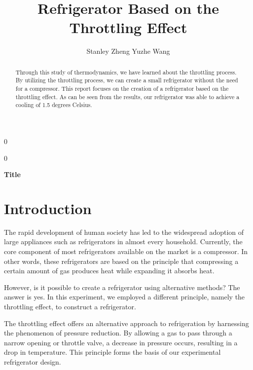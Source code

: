 \documentclass[12pt]{article}
\newcommand{\blind}{0}
\begin{document}

%

\def\spacingset#1{\renewcommand{\baselinestretch}%
{#1}\small\normalsize} \spacingset{1}



\blind
{
  \title{\bf Refrigerator Based on the Throttling Effect }
  \author{Stanley Zheng \quad Yuzhe Wang}
  \maketitle
} \fi

\blind
{
  \bigskip
  \bigskip
  \bigskip
  \begin{center}
    {\LARGE\bf Title}
\end{center}
  \medskip
} \fi

\bigskip
\begin{abstract}
Through this study of thermodynamics, we have learned about the throttling process. By utilizing the throttling process, we can create a small refrigerator without the need for a compressor. This report focuses on the creation of a refrigerator based on the throttling effect. As can be seen from the results, our refrigerator was able to achieve a cooling of 1.5 degrees Celsius.
\end{abstract}


\spacingset{1.45}
\section{Introduction}
\label{sec:intro}

The rapid development of human society has led to the widespread adoption of large appliances such as refrigerators in almost every household. Currently, the core component of most refrigerators available on the market is a compressor. In other words, these refrigerators are based on the principle that compressing a certain amount of gas produces heat while expanding it absorbs heat.

However, is it possible to create a refrigerator using alternative methods? The answer is yes. In this experiment, we employed a different principle, namely the throttling effect, to construct a refrigerator.

The throttling effect offers an alternative approach to refrigeration by harnessing the phenomenon of pressure reduction. By allowing a gas to pass through a narrow opening or throttle valve, a decrease in pressure occurs, resulting in a drop in temperature. This principle forms the basis of our experimental refrigerator design.
\end{document}
